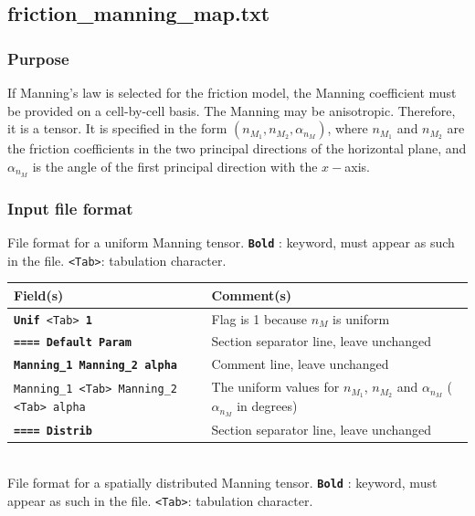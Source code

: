\subsection{friction\_manning\_map.txt}
\subsubsection{Purpose}
If Manning's law is selected for the friction model, the Manning coefficient must be provided on a cell-by-cell basis. The Manning may be anisotropic. Therefore, it is a tensor. It is specified in the form $(n_{M_1} , n_{M_2}, \alpha_{n_M})$, where $n_{M_1}$ and $n_{M_2}$ are the friction coefficients in the two principal directions of the horizontal plane, and $\alpha_{n_M}$ is the angle of the first principal direction with the $x-$axis.
%
\subsubsection{Input file format}
%
File format for a uniform Manning tensor.  \texttt{\textbf{Bold}} : keyword, must appear as such in the file. \texttt{<Tab>}: tabulation character. \\
    \begin{tabular}{p{6cm} | p{9cm}}
    \hline
    Field(s) & Comment(s) \\
    \hline  \hline
    \texttt{\textbf{Unif} <Tab> \textbf{1}} & Flag is 1 because $n_M$ is uniform \\ \hline
    \texttt{\textbf{==== Default Param}} & Section separator line, leave unchanged \\  \hline
    \texttt{\textbf{Manning\_1 Manning\_2 alpha}} & Comment line, leave unchanged \\  \hline
    \texttt{Manning\_1 <Tab> Manning\_2 <Tab> alpha} & The uniform values for $n_{M_1}$, $n_{M_2}$ and $\alpha_{n_M}$ ($\alpha_{n_M}$ in degrees) \\ \hline
    \texttt{\textbf{==== Distrib}} & Section separator line, leave unchanged \\  \hline
    \end{tabular}
%
\vspace{10mm} \\
%
File format for a spatially distributed Manning tensor.  \texttt{\textbf{Bold}} : keyword, must appear as such in the file. \texttt{<Tab>}: tabulation character. \\
